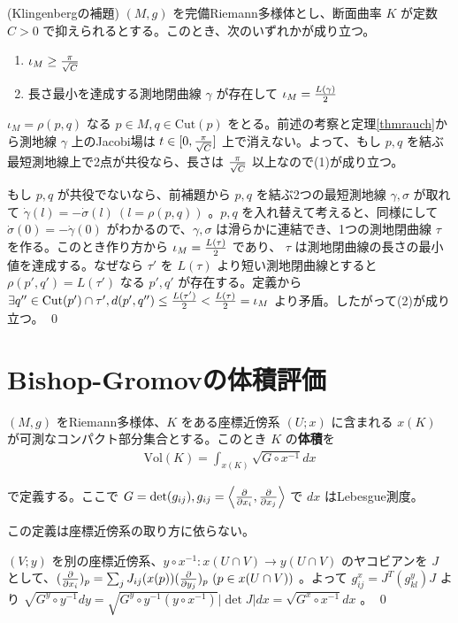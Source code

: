 \documentclass[dvipdfmx,a4paper]{jsreport}
\theoremstyle{definition}
\newcommand{\der}{\partial}
\begin{document}
\thm\label{thmklingenberg} (Klingenbergの補題) $(M,g)$ を完備Riemann多様体とし、断面曲率 $K$ が定数 $C>0$ で抑えられるとする。このとき、次のいずれかが成り立つ。
\begin{enumerate}
    \item $\iota_M \geq {\pi \over \sqrt{C}}$
    \item 長さ最小を達成する測地閉曲線 $\gamma$ が存在して $\iota_M={L(\gamma) \over 2}$
\end{enumerate}

\prf $\iota_M=\rho(p,q)$ なる $p \in M,q \in \mbox{Cut}(p)$ をとる。前述の考察と定理\ref{thmrauch}から測地線 $\gamma$ 上のJacobi場は $t \in [0,{\pi \over \sqrt{C}}]$ 上で消えない。よって、もし $p,q$ を結ぶ最短測地線上で2点が共役なら、長さは ${\pi \over \sqrt{C}}$ 以上なので(1)が成り立つ。

もし $p,q$ が共役でないなら、前補題から $p,q$ を結ぶ2つの最短測地線 $\gamma,\sigma$ が取れて $\dot{\gamma}(l)=-\dot{\sigma}(l)\ (l=\rho(p,q))$ 。$p,q$ を入れ替えて考えると、同様にして $\dot{\sigma}(0)=-\dot{\gamma}(0)$ がわかるので、$\gamma,\sigma$ は滑らかに連結でき、1つの測地閉曲線 $\tau$ を作る。このとき作り方から $\iota_M={L(\tau) \over 2}$ であり、 $\tau$ は測地閉曲線の長さの最小値を達成する。なぜなら $\tau'$ を $L(\tau)$ より短い測地閉曲線とすると $\rho(p',q')=L(\tau')$ なる $p',q'$ が存在する。定義から $\exists q'' \in \mbox{Cut}(p') \cap \tau',d(p',q'') \leq {L(\tau') \over 2}<{L(\tau) \over 2}=\iota_M$ より矛盾。したがって(2)が成り立つ。 \qed 

\section{Bishop-Gromovの体積評価}

 $(M,g)$ をRiemann多様体、$K$ をある座標近傍系 $(U;x)$ に含まれる $x(K)$ が可測なコンパクト部分集合とする。このとき $K$ の\textbf{体積}を
\begin{align*}
    \mbox{Vol}(K)=\int_{x(K)} \sqrt{G \circ x^{-1}}dx
\end{align*}

で定義する。ここで $G=\det(g_{ij}),g_{ij}=\ev{{\der \over \der x_i},{\der \over \der x_j}}$ で $dx$ はLebesgue測度。

\lem この定義は座標近傍系の取り方に依らない。

\prf $(V;y)$ を別の座標近傍系、$y\circ x^{-1}:x(U\cap V) \to y(U\cap V)$ のヤコビアンを $J$ として、$({\der \over \der x_i})_p=\sum_j J_{ij}(x(p))({\der \over \der y_j})_p \ (p \in x(U \cap V))$ 。よって $g_{ij}^x=J^T(g_{kl}^y)J$ より $\sqrt{G^y\circ y^{-1}} dy=\sqrt{G^y \circ y^{-1}(y \circ x^{-1})}|\det J|dx=\sqrt{G^x \circ x^{-1}}dx$ 。 \qed
\\
\end{document}
